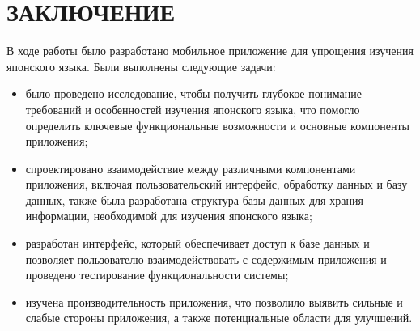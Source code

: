 \chapter*{ЗАКЛЮЧЕНИЕ}

В ходе работы было разработано мобильное приложение для упрощения изучения японского языка. Были выполнены следующие задачи:

\begin{itemize}[label=---]
    \item было проведено исследование, чтобы получить глубокое понимание требований и особенностей изучения японского языка, что помогло определить ключевые функциональные возможности и основные компоненты приложения;
    \item спроектировано взаимодействие между различными компонентами приложения, включая пользовательский интерфейс, обработку данных и базу данных, также была разработана структура базы данных для храния информации, необходимой для изучения японского языка;
    \item разработан интерфейс, который обеспечивает доступ к базе данных и позволяет пользователю взаимодействовать с содержимым приложения и проведено тестирование функциональности системы;
    \item изучена производительность приложения, что позволило выявить сильные и слабые стороны приложения, а также потенциальные области для улучшений.
\end{itemize}
